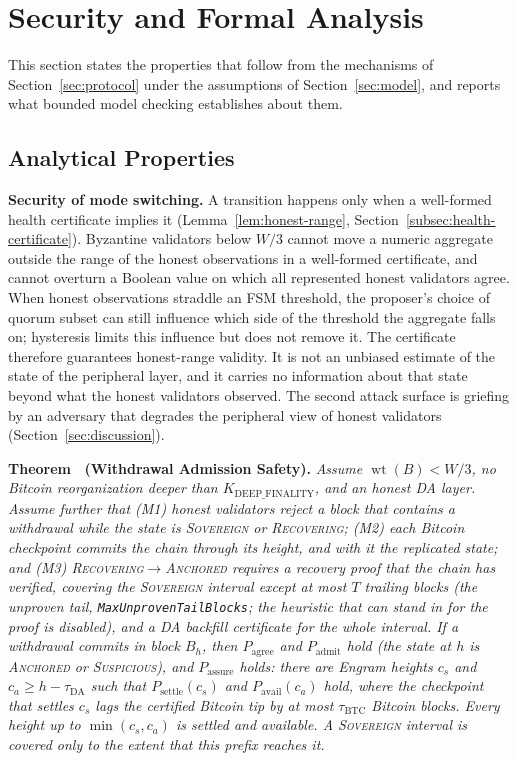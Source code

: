 \section{Security and Formal Analysis}
\label{sec:formal}

This section states the properties that follow from the mechanisms of
Section~\ref{sec:protocol} under the assumptions of Section~\ref{sec:model},
and reports what bounded model checking establishes about them.

\subsection{Analytical Properties}
\label{subsec:analytical}

\textbf{Security of mode switching.} A transition happens only when a
well-formed health certificate implies it (Lemma~\ref{lem:honest-range},
Section~\ref{subsec:health-certificate}). Byzantine validators below $W/3$
cannot move a numeric aggregate outside the range of the honest observations
in a well-formed certificate, and cannot overturn a Boolean value on which all
represented honest validators agree. When honest observations straddle an FSM
threshold, the proposer's choice of quorum subset can still influence which
side of the threshold the aggregate falls on; hysteresis limits this
influence but does not remove it. The certificate therefore guarantees
honest-range validity. It is not an unbiased estimate of the state of the
peripheral layer, and it carries no information about that state beyond what
the honest validators observed. The second attack surface is griefing by an
adversary that degrades the peripheral view of honest validators
(Section~\ref{sec:discussion}).

\label{thm:withdrawal}\textbf{Theorem~\thetheorem{} (Withdrawal Admission Safety).} \emph{Assume $\operatorname{wt}(B) < W/3$, no Bitcoin
reorganization deeper than $K_{\text{DEEP\_FINALITY}}$, and an honest DA
layer. Assume further that (M1) honest validators reject a block that
contains a withdrawal while the state is \textsc{Sovereign} or
\textsc{Recovering}; (M2) each Bitcoin checkpoint commits the chain through
its height, and with it the replicated state; and (M3)
\textsc{Recovering}$\to$\textsc{Anchored} requires a recovery proof that the
chain has verified, covering the \textsc{Sovereign} interval except at most
$T$ trailing blocks (the unproven tail, \texttt{MaxUnprovenTailBlocks}; the heuristic that can stand in for the proof is disabled), and a DA backfill certificate for the whole
interval. If a withdrawal commits in block $B_h$, then
$P_{\text{agree}}$ and $P_{\text{admit}}$ hold (the state at $h$ is \textsc{Anchored} or
\textsc{Suspicious}), and $P_{\text{assure}}$ holds: there are Engram heights $c_s$ and $c_a \geq h - \tau_{\text{DA}}$ such
that $P_{\text{settle}}(c_s)$ and $P_{\text{avail}}(c_a)$ hold, where the
checkpoint that settles $c_s$ lags the certified Bitcoin tip by at most
$\tau_{\text{BTC}}$ Bitcoin blocks. Every height up to $\min(c_s, c_a)$ is
settled and available. A \textsc{Sovereign} interval is covered only to the
extent that this prefix reaches it.}

